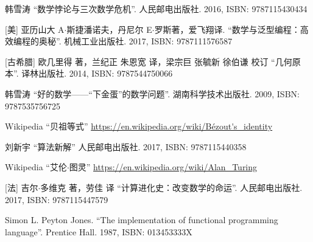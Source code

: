 \documentclass[UTF8]{article}
\begin{document}
\ifx\wholebook\relax \else
\begin{thebibliography}{99}

韩雪涛 ``数学悖论与三次数学危机''. 人民邮电出版社. 2016, ISBN: 9787115430434

[美] 亚历山大 A$\cdot$斯捷潘诺夫，丹尼尔 E$\cdot$罗斯著，爱飞翔译. ``数学与泛型编程：高效编程的奥秘''. 机械工业出版社. 2017, ISBN: 9787111576587

[古希腊] 欧几里得 著，兰纪正 朱恩宽 译，梁宗巨 张毓新 徐伯谦 校订 ``几何原本''. 译林出版社. 2014, ISBN: 9787544750066

韩雪涛 ``好的数学——“下金蛋”的数学问题''. 湖南科学技术出版社. 2009, ISBN: 9787535756725

Wikipedia ``贝祖等式'' \url{https://en.wikipedia.org/wiki/Bézout's_identity}

刘新宇 ``算法新解'' 人民邮电出版社. 2017, ISBN: 9787115440358

Wikipedia ``艾伦$\cdot$图灵'' \url{https://en.wikipedia.org/wiki/Alan_Turing}

[法] 吉尔$\cdot$多维克 著，劳佳 译 ``计算进化史：改变数学的命运''. 人民邮电出版社. 2017, ISBN: 9787115447579

Simon L. Peyton Jones. ``The implementation of functional programming language''. Prentice Hall. 1987, ISBN: 013453333X

\end{thebibliography}

\expandafter\enddocument

\fi
\end{document}

